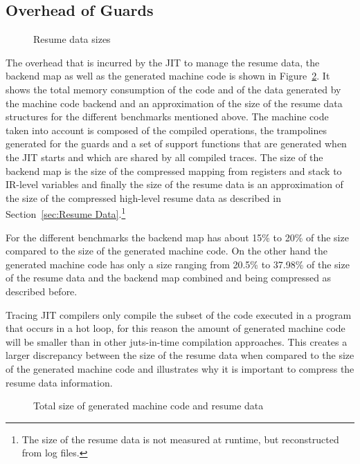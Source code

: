 \documentclass[10pt,preprint]{sigplanconf}
\begin{document}
\subsection{Overhead of Guards}
\label{sub:guard_overhead}
\begin{figure}
    
    \caption{Resume data sizes}
    \label{fig:resume_data_sizes}
\end{figure}

The overhead that is incurred by the JIT to manage the resume data,
the backend map as well as the generated machine code is
shown in Figure~\ref{fig:backend_data}. It shows the total memory consumption
of the code and of the data generated by the machine code backend and an
approximation of the size of the resume data structures for the
different benchmarks mentioned above. The machine code taken into account is
composed of the compiled operations, the trampolines generated for the guards
and a set of support functions that are generated when the JIT starts and which
are shared by all compiled traces. The size of the backend map
is the size of the compressed mapping from registers and stack to
IR-level variables and finally the size of the resume data is an
approximation of the size of the compressed high-level resume data as described
in Section~\ref{sec:Resume Data}.\footnote{
The size of the resume data is not measured at runtime, but reconstructed from
log files.}

For the different benchmarks the backend map has
about 15\% to 20\% of the size compared to the size of the
generated machine code. On the other hand the generated machine code has only a
size ranging from 20.5\% to 37.98\% of the size of the resume data and the backend map
combined and being compressed as described before.

Tracing JIT compilers only compile the subset of the code executed in a program
that occurs in a hot loop, for this reason the amount of generated machine
code will be smaller than in other juts-in-time compilation approaches.  This
creates a larger discrepancy between the size of the resume data when
compared to the size of the generated machine code and illustrates why it is important to compress the resume data information.

\begin{figure}
    
    \caption{Total size of generated machine code and resume data}
    \label{fig:backend_data}
\end{figure}
\end{document}
